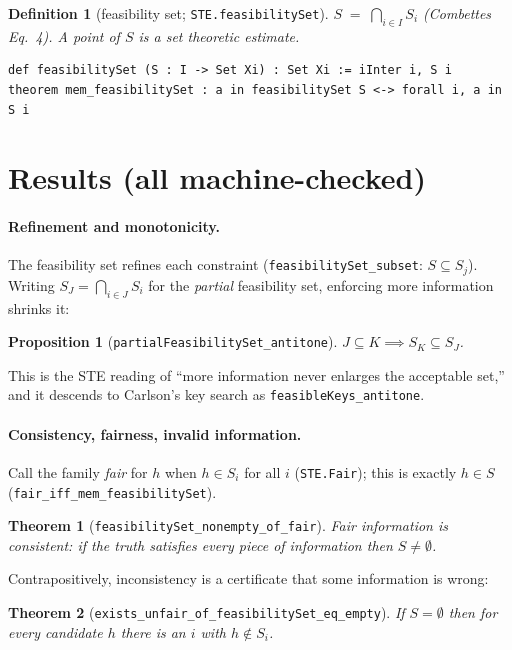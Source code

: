 \documentclass[11pt]{article}
\newtheorem{theorem}{Theorem}
\newtheorem{proposition}{Proposition}
\newtheorem{definition}{Definition}
\begin{document}
\begin{definition}[feasibility set; \texttt{STE.feasibilitySet}]
$S \;=\; \bigcap_{i\in I} S_i$ (Combettes Eq.~4). A point of $S$ is a
\emph{set theoretic estimate}.
\end{definition}

\begin{lstlisting}
def feasibilitySet (S : I -> Set Xi) : Set Xi := iInter i, S i
theorem mem_feasibilitySet : a in feasibilitySet S <-> forall i, a in S i
\end{lstlisting}

\section{Results (all machine-checked)}

\paragraph{Refinement and monotonicity.}
The feasibility set refines each constraint
(\texttt{feasibilitySet\_subset}: $S\subseteq S_j$). Writing
$S_J=\bigcap_{i\in J}S_i$ for the \emph{partial} feasibility set,
enforcing more information shrinks it:
\begin{proposition}[\texttt{partialFeasibilitySet\_antitone}]
$J\subseteq K \implies S_K \subseteq S_J$.
\end{proposition}
\noindent This is the STE reading of ``more information never enlarges
the acceptable set,'' and it descends to Carlson's key search as
\texttt{feasibleKeys\_antitone}.

\paragraph{Consistency, fairness, invalid information.}
Call the family \emph{fair} for $h$ when $h\in S_i$ for all $i$
(\texttt{STE.Fair}); this is exactly $h\in S$
(\texttt{fair\_iff\_mem\_feasibilitySet}).
\begin{theorem}[\texttt{feasibilitySet\_nonempty\_of\_fair}]
Fair information is consistent: if the truth satisfies every piece of
information then $S\ne\emptyset$.
\end{theorem}
Contrapositively, inconsistency is a certificate that some information is
wrong:
\begin{theorem}[\texttt{exists\_unfair\_of\_feasibilitySet\_eq\_empty}]
If $S=\emptyset$ then for every candidate $h$ there is an $i$ with
$h\notin S_i$.
\end{theorem}
\end{document}
